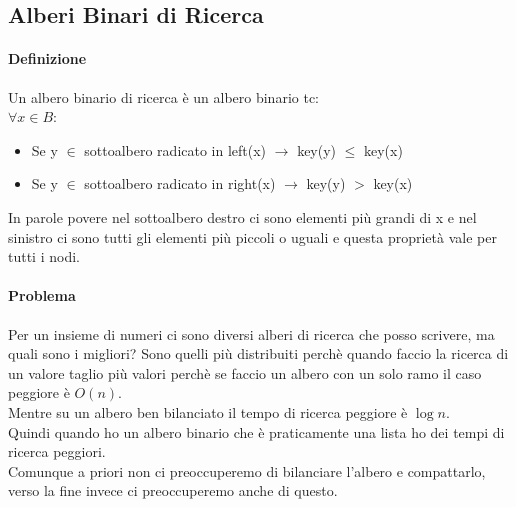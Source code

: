 \subsection{Alberi Binari di Ricerca}
\paragraph*{Definizione} Un albero binario di ricerca è un albero binario tc:\\
$\forall x \in B$:\\
\begin{itemize}
    \item Se y $\in$ sottoalbero radicato in left(x) $\rightarrow$ key(y) $\leq$ key(x)
    \item Se y $\in$ sottoalbero radicato in right(x) $\rightarrow$ key(y) $>$ key(x)
\end{itemize}
In parole povere nel sottoalbero destro ci sono elementi più grandi di x e nel sinistro ci sono 
tutti gli elementi più piccoli o uguali e questa proprietà vale per tutti i nodi.
\paragraph*{Problema} Per un insieme di numeri ci sono diversi alberi di ricerca che posso scrivere,
ma quali sono i migliori? Sono quelli più distribuiti perchè quando faccio la ricerca di un
valore taglio più valori perchè se faccio un albero con un solo ramo il caso peggiore è $O(n)$.\\
Mentre su un albero ben bilanciato il tempo di ricerca peggiore è $\log n$.\\
Quindi quando ho un albero binario che è praticamente una lista ho dei tempi di ricerca peggiori.\\
Comunque a priori non ci preoccuperemo di bilanciare l'albero e compattarlo, verso la fine invece
ci preoccuperemo anche di questo.